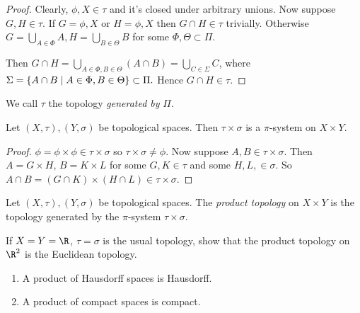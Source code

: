 \begin{proof}
Clearly, $\phi, X\in \tau$ and it's closed under arbitrary unions. Now suppose $G,H\in \tau$. If $G = \phi, X$ or $H=\phi, X$ then $G\cap H\in \tau$ trivially. Otherwise $G = \bigcup_{A\in \Phi}A, H =\bigcup_{B\in \Theta} B$ for some $\Phi, \Theta \subset \Pi$.

Then $G\cap H = \bigcup_{A\in \Phi, B\in \Theta} (A\cap B) = \bigcup_{C\in \Sigma} C$, where $\Sigma = \{A\cap B\mid A\in \Phi, B\in \Theta\}\subset \Pi.$ Hence $G\cap H\in \tau$.
\end{proof}
\begin{definition}
We call $\tau$ the topology \emph{generated by} $\Pi$.
\end{definition}
\begin{proposition}                        %
Let $(X,\tau), (Y,\sigma)$ be topological spaces. Then $\tau\times \sigma$ is a $\pi$-system on $X\times Y$.
\end{proposition}
\begin{proof}
$\phi = \phi\times \phi \in \tau\times \sigma$ so $\tau\times \sigma\neq \phi$. Now suppose $A,B\in\tau\times \sigma $. Then $A = G\times H$, $B=K\times L$ for some $G,K\in \tau$ and some $H,L,\in \sigma$. So $A\cap B = (G\cap K)\times (H\cap L) \in \tau\times \sigma$.
\end{proof}
\begin{definition}
Let $(X,\tau), (Y,\sigma)$ be topological spaces. The \emph{product topology} on $X\times Y$ is the topology generated by the $\pi$-system $\tau\times \sigma$.
\end{definition}
\begin{exercise*}
If $X=Y=\R$, $\tau=\sigma$ is the usual topology, show that the product topology on $\R^2$ is the Euclidean topology.
\end{exercise*}

\begin{theorem}                             %
\begin{enumerate}
    \item A product of Hausdorff spaces is Hausdorff.
    \item A product of compact spaces is compact.
\end{enumerate}
\end{theorem}

